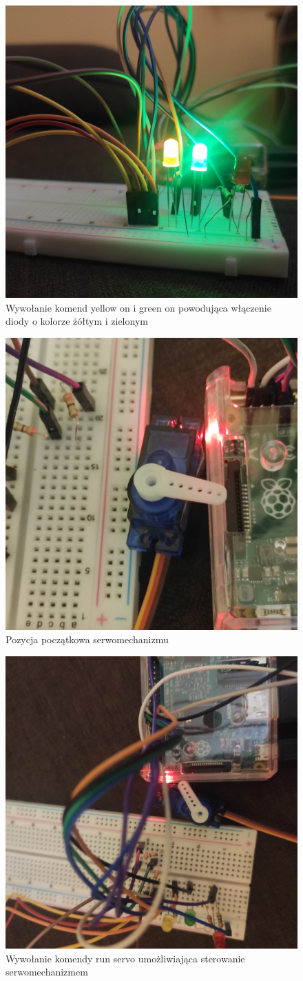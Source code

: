 \begin{figure}[htbp]
	\centering
	\includegraphics[width=0.5\linewidth]{"obrazy/yellowgreen.jpg"}
	\caption{Wywołanie komend yellow on i green on powodująca włączenie diody o kolorze żółtym i zielonym}
	\label{fig:54}
\end{figure}
\begin{figure}[htbp]
	\centering
	\includegraphics[width=0.5\linewidth]{"obrazy/servo1.jpg"}
	\caption{Pozycja początkowa serwomechanizmu}
	\label{fig:55}
\end{figure}
\begin{figure}[htbp]
	\centering
	\includegraphics[width=0.5\linewidth]{"obrazy/servo2.jpg"}
	\caption{Wywołanie komendy run servo umożliwiająca sterowanie serwomechanizmem }
	\label{fig:56}
\end{figure}




